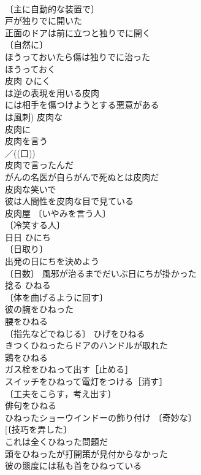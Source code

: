 \documentclass[8pt]{extreport}
\begin{document}
\begin{CJK}{UTF8}{min}
\\	〔主に自動的な装置で〕
\\	戸が独りでに開いた 
\\	正面のドアは前に立つと独りでに開く 
\\	〔自然に〕
\\	ほうっておいたら傷は独りでに治った 
\\	ほうっておく　
\\	皮肉	ひにく	
\\	は逆の表現を用いる皮肉
\\	には相手を傷つけようとする悪意がある
\\	は風刺) 皮肉な 
\\	皮肉に 
\\	皮肉を言う 
\\	／((口))
\\	皮肉で言ったんだ 
\\	がんの名医が自らがんで死ぬとは皮肉だ 
\\	皮肉な笑いで 
\\	彼は人間性を皮肉な目で見ている 
\\	皮肉屋 〔いやみを言う人〕
\\	〔冷笑する人〕
\\	日日	ひにち	
\\	〔日取り〕
\\	出発の日にちを決めよう 
\\	〔日数〕 風邪が治るまでだいぶ日にちが掛かった 
\\	捻る	ひねる	
\\	〔体を曲げるように回す〕
\\	彼の腕をひねった 
\\	腰をひねる 
\\	〔指先などでねじる〕 ひげをひねる 
\\	きつくひねったらドアのハンドルが取れた 
\\	鶏をひねる 
\\	ガス栓をひねって出す［止める］ 
\\	スイッチをひねって電灯をつける［消す］ 
\\	〔工夫をこらす，考え出す〕
\\	俳句をひねる 
\\	ひねったショーウインドーの飾り付け 〔奇妙な〕
\\	[〔技巧を弄した〕
\\	これは全くひねった問題だ 
\\	頭をひねったが打開策が見付からなかった 
\\	彼の態度には私も首をひねっている 

\end{CJK}
\end{document}
